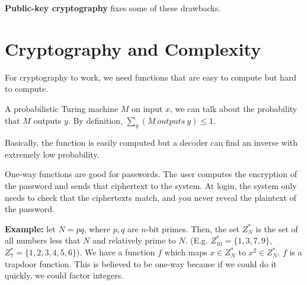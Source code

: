 \documentclass[twoside]{article}
\begin{document}
\textbf{Public-key cryptography} fixes some of these drawbacks.  


\section*{Cryptography and Complexity}

For cryptography to work, we need functions that are easy to compute but hard to compute.




A probabilistic Turing machine $M$ on input $x$, we can talk about the probability that $M$ outputs $y$.  By definition, $\sum\limits_y (M \ outputs \ y)\leq 1$.


Basically, the function is easily computed but a decoder can find an inverse with extremely low probability.

One-way functions are good for passwords.  The user computes the encryption of the password and sends that ciphertext to the system.  At login, the system only needs to check that the ciphertexts match, and you never reveal the plaintext of the password.


\textbf{Example:} let $N=pq$, where $p,q$ are $n$-bit primes.  Then, the set $Z_N^*$ is the set of all numbers less that $N$ and relatively prime to $N$. (E.g. $Z_{10}^*=\{1,3,7,9\}$, $Z_7^*=\{1,2,3,4,5,6\}$).  We have a function $f$ which maps $x\in Z_N^*$ to $x^2\in Z_N^*$.  $f$ is a trapdoor function.  This is believed to be one-way because if we could do it quickly, we could factor integers.
\end{document}
